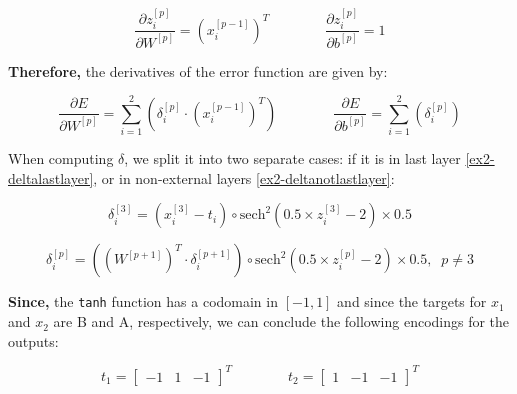 \documentclass[12pt]{article}
\begin{document}
\begin{enumerate}[leftmargin=\labelsep]
          \begin{equation*}
              \frac{\partial z^{[p]}_i}{\partial W^{[p]}} = \left(x^{[p-1]}_i\right)^{T} \qquad\qquad
              \frac{\partial z^{[p]}_i}{\partial b^{[p]}} = 1
          \end{equation*}

          \textbf{Therefore,} the derivatives of the error function are given by:

          \begin{equation}\label{ex2-derivate-loss-smiplified}
            \frac{\partial E}{\partial W^{[p]}} = \sum_{i=1}^{2} \left(\delta^{[p]}_i \cdot \left(x^{[p-1]}_i\right)^{T} \right) \qquad\qquad
            \frac{\partial E}{\partial b^{[p]}} = \sum_{i=1}^{2} \left(\delta^{[p]}_i\right)
          \end{equation}

          When computing \(\delta\), we split it into two separate cases: if it is in  last layer \eqref{ex2-deltalastlayer}, or in non-external
          layers \eqref{ex2-deltanotlastlayer}:

          \begin{equation}\label{ex2-deltalastlayer}
              \delta^{[3]}_i = \left(x^{[3]}_i - t_i\right) \circ \text{sech}^{2}\left(0.5 \times z^{[3]}_i - 2\right) \times 0.5
          \end{equation}

          \begin{equation}\label{ex2-deltanotlastlayer}
              \delta^{[p]}_i = \left(\left(W^{[p+1]}\right)^{T} \cdot \delta^{[p+1]}_i\right) \circ \text{sech}^{2}\left(0.5 \times z^{[p]}_i - 2\right) \times 0.5, \;\; p \neq 3
          \end{equation}

          \textbf{Since,} the \texttt{tanh} function has a codomain in $[-1,1]$ and since the targets for $x_1$ and $x_2$ are B and A, respectively, we can
          conclude the following encodings for the outputs:

          \begin{equation*}
              t_1 = \begin{bmatrix} -1 & 1 & -1\end{bmatrix}^T \qquad\qquad
              t_2 = \begin{bmatrix} 1 & -1 & -1\end{bmatrix}^T
          \end{equation*}


\end{enumerate}
\end{document}
